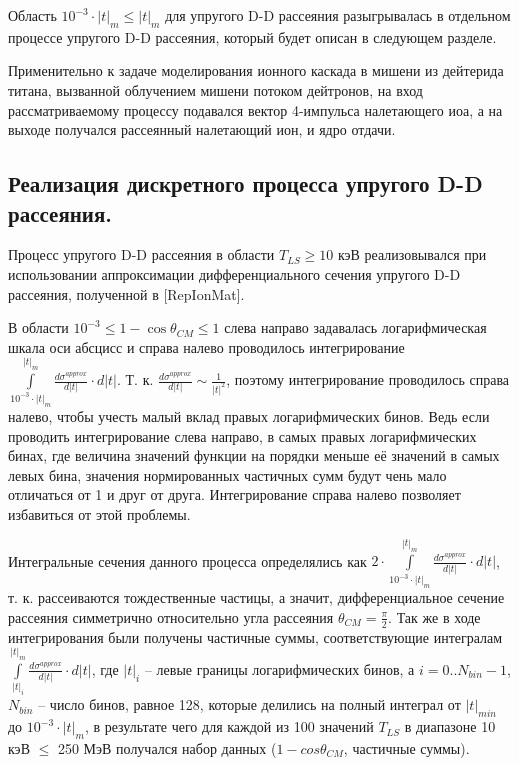 \documentclass[a4paper,12pt]{article}
\begin{document}
\begin{large}
	Область $10^{-3} \cdot |t|_m \leq |t|_m$ для упругого D-D рассеяния разыгрывалась в отдельном процессе упругого D-D рассеяния, который будет описан в следующем разделе.
	
	Применительно к задаче моделирования ионного каскада в мишени из дейтерида титана, вызванной облучением мишени потоком дейтронов, на вход рассматриваемому процессу подавался вектор 4-импульса налетающего иоа, а на выходе получался рассеянный налетающий ион, и ядро отдачи.


\subsection{Реализация дискретного процесса упругого D-D рассеяния.}
\label{ElasticDDScatteringRealization}

	Процесс упругого D-D рассеяния в области $T_{LS} \geq 10$ кэВ реализовывался при использовании аппроксимации дифференциального сечения упругого D-D рассеяния, полученной в [RepIonMat].
	
	В области $10^{-3} \leq 1-\cos{\theta_{CM}} \leq 1$ слева направо задавалась логарифмическая шкала оси абсцисс и справа налево проводилось интегрирование $\int \limits^{|t|_m}_{10^{-3}\cdot |t|_m} \frac{d\sigma^{approx}}{d|t|} \cdot d|t|$.
	Т. к. $\frac{d\sigma^{approx}}{d|t|} \sim \frac{1}{|t|^2}$, поэтому интегрирование проводилось справа налево, чтобы учесть малый вклад правых логарифмических бинов.
	Ведь если проводить интегрирование слева направо, в самых правых логарифмических бинах, где величина значений функции на порядки меньше её значений в самых левых бина, значения нормированных частичных сумм будут чень мало отличаться от 1 и друг от друга.
	Интегрирование справа налево позволяет избавиться от этой проблемы.
	
	Интегральные сечения данного процесса определялись как $2 \cdot \int \limits^{|t|_m}_{10^{-3}\cdot |t|_m} \frac{d\sigma^{approx}}{d|t|} \cdot d|t|$, т. к. рассеиваются тождественные частицы, а значит, дифференциальное сечение рассеяния симметрично относительно угла рассеяния $\theta_{CM}=\frac{\pi}{2}$.
	Так же в ходе интегрирования были получены частичные суммы, соответствующие интегралам $\int \limits^{|t|_m}_{|t|_i} \frac{d\sigma^{approx}}{d|t|} \cdot d|t|$, где $|t|_i$ -- левые границы логарифмических бинов, а $i=0..N_{bin}-1$, $N_{bin}$ -- число бинов, равное 128, которые делились на полный интеграл от $|t|_{min}$ до $10^{-3} \cdot |t|_m$, в результате чего для каждой из 100 значений $T_{LS}$ в диапазоне 10 кэВ $\leq$ 250 МэВ получался набор данных ($1-cos{\theta_{CM}}$, частичные суммы).
	

\end{large}
\end{document}
